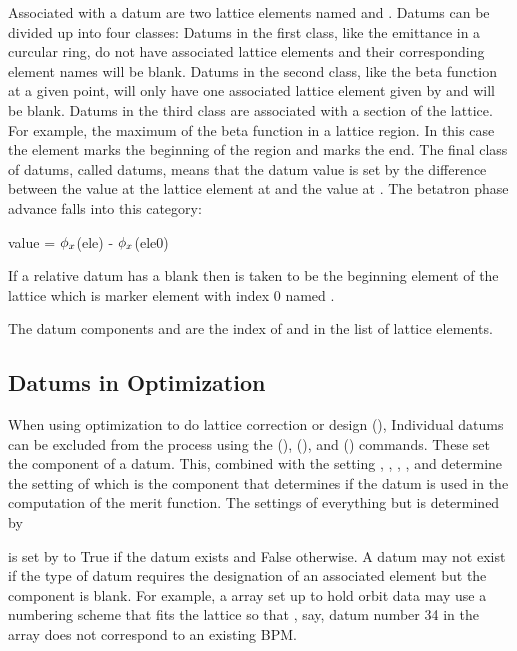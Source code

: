 Associated with a datum are two lattice elements named
 and . Datums can be divided up into four
classes: Datums in the first class, like the emittance in a curcular
ring, do not have associated lattice elements and their corresponding
element names will be blank. Datums in the second class, like the beta
function at a given point, will only have one associated lattice
element given by  and  will be blank.
Datums in the third class are associated with a section of the
lattice. For example, the maximum of the beta function in a lattice
region. In this case the  element marks the beginning of the
region and  marks the end. The final class of datums, called
 datums, means that the datum value is set by the
difference between the value at the lattice element at  and
the value at . The betatron phase advance falls into this
category:
\begin{example}
  value = \(\phi\sb{x}\)(ele) - \(\phi\sb{x}\)(ele0)
\end{example}
If a relative datum has a blank  then  is taken
to be the beginning element of the lattice which is marker element
with index 0 named .

The datum components  and  are the index of
 and  in the list of lattice elements.

\subsection{Datums in Optimization}
\label{s:datum.opt}

When using optimization to do lattice correction or design
(), Individual datums can be excluded from the process
using the  (),  (),
and  () commands. These set the 
component of a datum. This, combined with the setting ,
, , , and 
determine the setting of  which is the component that
determines if the datum is used in the computation of the merit
function. The settings of everything but  is determined
by \tao

 is set by \tao to True if the datum exists and False
otherwise. A datum may not exist if the type of datum requires the
designation of an associated element but the  component
is blank. For example, a  array set up to hold orbit data
may use a numbering scheme that fits the lattice so that , say, datum
number 34 in the array does not correspond to an existing BPM.

